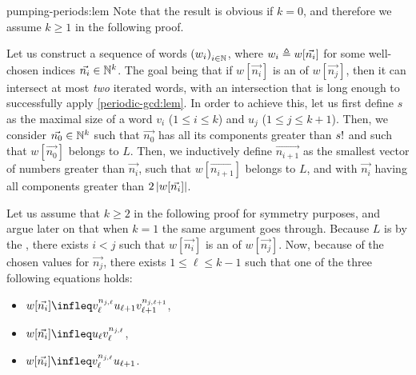 \begin{proofof}{pumping-periods:lem}
    Note that the result is obvious if $k = 0$, and therefore
    we assume $k \geq 1$ in the following proof.

    Let us construct a sequence of words $\seqof{w_i}[i \in \Nat]$, where $w_i
    \triangleq w[\vec{n_i}]$ for some well-chosen indices $\vec{n_i} \in \mathbb{N}^k$.
    The goal being that if $w[\vec{n_i}]$ is an  of $w[\vec{n_j}]$,
    then it can intersect at most \emph{two} iterated words, with an
    intersection that is long enough to successfully apply
    \cref{periodic-gcd:lem}. In order to achieve this, let us first define $s$
    as the maximal size of a word $v_i$ ($1 \leq i \leq k$) and $u_j$ ($1 \leq
    j \leq k+1$). Then, we consider $\vec{n_0} \in \mathbb{N}^k$ such that
    $\vec{n_0}$ has all its components greater than $\factorial{s}$ and such
    that $w[\vec{n_0}]$ belongs to $L$. Then, we inductively define
    $\vec{n_{i+1}}$  as the smallest vector of numbers greater than
    $\vec{n_i}$, such that $w[\vec{n_{i+1}}]$ belongs to $L$, and with
    $\vec{n_i}$ having all components greater than $2\left| w[\vec{n_i}] \right|$.

    Let us assume that $k \geq 2$ in the following proof for symmetry purposes,
    and argue later on that when $k = 1$ the same argument goes through.
    Because $L$ is  by the , there
    exists $i < j$ such that $w[\vec{n_i}]$ is an  of $w[\vec{n_j}]$.
    Now, because of the chosen values for $\vec{n_j}$, there exists $1 \leq \ell \leq
    k-1$ such that
    one of the three following equations holds:
    \begin{itemize}
        \item $w[\vec{n_i}] \infleq v_{\ell}^{n_{j,\ell}} u_{\ell+1} v_{\ell+1}^{n_{j,\ell+1}}$,
        \item $w[\vec{n_i}] \infleq u_{\ell}
            v_{\ell}^{n_{j,\ell}}$,
        \item $w[\vec{n_i}] \infleq
            v_{\ell}^{n_{j,\ell}} u_{\ell+1}$.
    \end{itemize}


\end{proofof}
